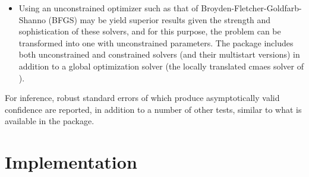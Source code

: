 \begin{itemize}
\item Using an unconstrained optimizer such as that of Broyden-Fletcher-Goldfarb-Shanno (BFGS) may be yield superior results given the strength and sophistication of these solvers, and for this purpose, the problem can be transformed into one with unconstrained parameters. The \verb@racd@ package includes both unconstrained and constrained solvers (and their multistart versions) in addition to a global optimization solver (the locally translated cmaes solver of \citet{Hansen2006}).\\
\end{itemize}
For inference, robust standard errors of \citet{White1982} which produce asymptotically valid confidence are reported, in addition to a number of other tests, similar to what is available in the \verb@rugarch@ package.

\section{Implementation}\label{sec:implementation}
